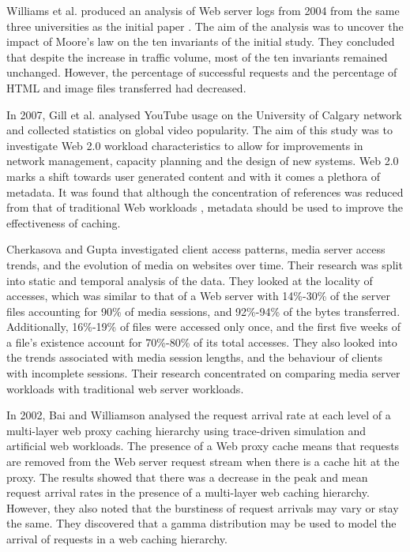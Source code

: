 \documentclass[10pt,conference]{IEEEtran}
\begin{document}
Williams et al. \cite{williams05} produced an analysis of Web server logs from 2004 from the same three universities as the initial paper \cite{keynote}. The aim of the analysis was to uncover the impact of Moore's law on the ten invariants of the initial study. They concluded that despite the increase in traffic volume, most of the ten invariants remained unchanged. However, the percentage of successful requests and the percentage of HTML and image files transferred had decreased. 

In 2007, Gill et al. \cite{youtube} analysed YouTube usage on the University of Calgary network and collected statistics on global video popularity. The aim of this study was to investigate Web 2.0 workload characteristics to allow for improvements in network management, capacity planning and the design of new systems. Web 2.0 marks a shift towards user generated content and with it comes a plethora of metadata. It was found that although the concentration of references was reduced from that of traditional Web workloads \cite{keynote}, metadata should be used to improve the effectiveness of caching.

Cherkasova and Gupta \cite{Cherkasova} investigated client access patterns, media server access trends, and the evolution of media on websites over time. Their research was split into static and temporal analysis of the data. They looked at the locality of accesses, which was similar to that of a Web server with 14\%-30\% of the server files accounting for 90\% of media sessions, and 92\%-94\% of the bytes transferred. Additionally, 16\%-19\% of files were accessed only once, and the first five weeks of a file's existence account for 70\%-80\% of its total accesses. They also looked into the trends associated with media session lengths, and the behaviour of clients with incomplete sessions. Their research concentrated on comparing media server workloads with traditional web server workloads.

In 2002, Bai and Williamson \cite{Bai} analysed the request arrival rate at each level of a multi-layer web proxy caching hierarchy using trace-driven simulation and artificial web workloads. The presence of a Web proxy cache means that requests are removed from the Web server request stream when there is a cache hit at the proxy. The results showed that there was a decrease in the peak and mean request arrival rates in the presence of a multi-layer web caching hierarchy. However, they also noted that the burstiness of request arrivals may vary or stay the same. They discovered that a gamma distribution may be used to model the arrival of requests in a web caching hierarchy.
\end{document}
